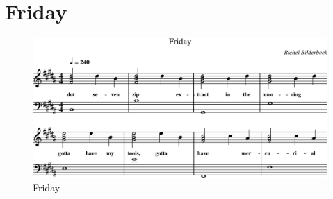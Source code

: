 \chapter{Friday}



\begin{figure}[!htbp]
  \includegraphics[width=\textwidth,height=\textheight,keepaspectratio]{../songs/54_friday.png}
  \caption{Friday}
  \label{fig:54_friday}
\end{figure}
